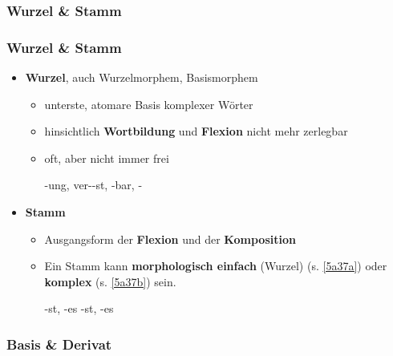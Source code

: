 \subsubsection{Wurzel \& Stamm}


\begin{frame}
\frametitle{Wurzel \& Stamm}

\begin{itemize}
	\item \textbf{Wurzel}, auch Wurzelmorphem, Basismorphem \citep[vgl.][]{Eins16d}
	
	\begin{itemize}
		\item unterste, atomare Basis komplexer Wörter
		\item hinsichtlich \textbf{Wortbildung} und \textbf{Flexion} nicht mehr zerlegbar
		\item oft, aber nicht immer frei
		
		\ea {}-ung, ver--st, -bar, -				
		\z 
	\end{itemize}


	\item \textbf{Stamm} \citep[vgl.][]{Eins16c}
	
	\begin{itemize}
		\item Ausgangsform der \textbf{Flexion} und der \textbf{Komposition}
		\item Ein Stamm kann \textbf{morphologisch einfach} (Wurzel) (s. \ref{5a37a}) oder \textbf{komplex} (s. \ref{5a37b}) sein.
	
		\ea 
			\ea\label{5a37a} -st, -es
			\ex\label{5a37b} -st, -es
			\z 
		\z 
	\end{itemize}
\end{itemize}

\end{frame}


\subsubsection{Basis \& Derivat}



